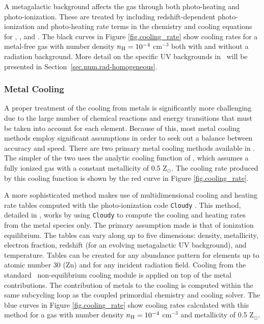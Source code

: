 A metagalactic background affects the gas through both
photo-heating and photo-ionization.  These are treated by including
redshift-dependent photo-ionization and photo-heating rate terms in the
chemistry and cooling equations for , , and .
The black curves in Figure \ref{fig.cooling_rate} show cooling rates for a
metal-free gas with number density $n_{\rm H} = 10^{-4}$ cm$^{-3}$ both with
and without a radiation background.  More detail on the specific UV backgrounds
in \enzo\ will be presented in Section~\ref{sec.num.rad-homogeneous}.

\subsubsection{Metal Cooling}

A proper treatment of the cooling from metals is significantly more
challenging due to the large number of chemical reactions and energy
transitions that must be taken into account for each element.  Because
of this, most metal cooling methods employ significant assumptions in
order to seek out a balance between accuracy and speed.  There are two
primary metal cooling methods available in \enzo.  The simpler of the
two uses the analytic cooling function of \citet{SW87}, which assumes
a fully ionized gas with a constant metallicity of 0.5 Z$_{\odot}$.
The cooling rate produced by this cooling function is shown by the red 
curve in Figure \ref{fig.cooling_rate}.

A more sophisticated method makes use of multidimensional cooling and
heating rate tables computed with the photo-ionization code
\texttt{Cloudy} \citep{1998PASP..110..761F}.  This method, detailed in
\citet{2008MNRAS.385.1443S, 2011ApJ...731....6S}, works by
using \texttt{Cloudy} to compute the cooling and heating rates from
the metal species only.  The primary assumption made is that of
ionization equilibrium.  The tables can vary along up to five dimensions:
density, metallicity, electron fraction,
redshift (for an evolving metagalactic UV background), and
temperature.  Tables can be created for any abundance pattern for
elements up to atomic number 30 (Zn) and for any incident radiation
field.  Cooling from the standard \enzo\ non-equilibrium cooling module is
applied on top of the metal contributions.  The contribution of metals
to the cooling is computed within the same subcycling loop as the
coupled primordial chemistry and cooling solver.  The blue curves in
Figure \ref{fig.cooling_rate} show cooling rates calculated with this
method for a gas with number density $n_{\rm H} = 10^{-4}$ cm$^{-3}$ and
metallicity of 0.5 Z$_{\odot}$.

